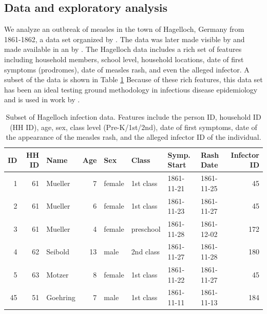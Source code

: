 \documentclass[
  shortnames]{jss}
\begin{document}
\subsection{Data and exploratory analysis}

We analyze an outbreak of measles in the town of Hagelloch, Germany from
1861-1862, a data set organized by \cite{pfeilsticker1863}. The data was
later made visible by \cite{oesterle1992} and made available in an
 by \cite{surveillance2017}. The Hagelloch data includes a
rich set of features including household members, school level,
household locations, date of first symptoms (prodromes), date of measles
rash, and even the alleged infector. A subset of the data is shown in
Table \ref{tab:hags-people} Because of these rich features, this data
set has been an ideal testing ground methodology in infectious disease
epidemiology and is used in work by
\cite{Neal2004,britton2011,groendyke2012,becker2016}.

\begin{CodeChunk}
\begin{table}[!h]

\caption{\label{tab:hags-people}Subset of Hagelloch infection data.  Features include the person ID, household ID (HH ID), age, sex, class level (Pre-K/1st/2nd), date of first symptoms, date of the appearance of the measles rash, and the alleged infector ID of the individual.}
\centering
\begin{tabular}[t]{rrlrllllr}
\toprule
ID & HH ID & Name & Age & Sex & Class & Symp. Start & Rash Date & Infector ID\\
\midrule
1 & 61 & Mueller & 7 & female & 1st class & 1861-11-21 & 1861-11-25 & 45\\
2 & 61 & Mueller & 6 & female & 1st class & 1861-11-23 & 1861-11-27 & 45\\
3 & 61 & Mueller & 4 & female & preschool & 1861-11-28 & 1861-12-02 & 172\\
4 & 62 & Seibold & 13 & male & 2nd class & 1861-11-27 & 1861-11-28 & 180\\
5 & 63 & Motzer & 8 & female & 1st class & 1861-11-22 & 1861-11-27 & 45\\
45 & 51 & Goehring & 7 & male & 1st class & 1861-11-11 & 1861-11-13 & 184\\
\bottomrule
\end{tabular}
\end{table}

\end{CodeChunk}
\end{document}
